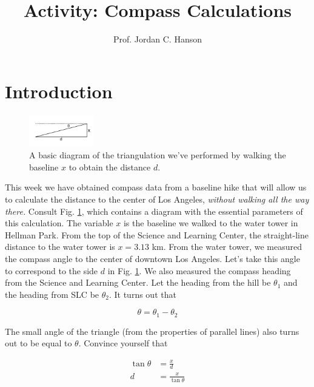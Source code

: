 \documentclass{article}
\begin{document}
\title{Activity: Compass Calculations}
\author{Prof. Jordan C. Hanson}

\maketitle

\section{Introduction}

\begin{figure}[ht]
\centering
\includegraphics[width=0.25\textwidth]{CompassTriangle.pdf}
\caption{\label{fig:triang} A basic diagram of the triangulation we've performed by walking the baseline $x$ to obtain the distance $d$.}
\end{figure}

This week we have obtained compass data from a baseline hike that will allow us to calculate the distance to the center of Los Angeles, \textit{without walking all the way there.}  Consult Fig. \ref{fig:triang}, which contains a diagram with the essential parameters of this calculation.  The variable $x$ is the baseline we walked to the water tower in Hellman Park.  From the top of the Science and Learning Center, the straight-line distance to the water tower is $x = 3.13$ km.  From the water tower, we measured the compass angle to the center of downtown Los Angeles.  Let's take this angle to correspond to the side $d$ in Fig. \ref{fig:triang}.  We also measured the compass heading from the Science and Learning Center.  Let the heading from the hill be $\theta_1$ and the heading from SLC be $\theta_2$.  It turns out that 

\begin{equation}
\theta = \theta_1 - \theta_2
\end{equation}

The small angle of the triangle (from the properties of parallel lines) also turns out to be equal to $\theta$.  Convince yourself that 

\begin{align}
\tan\theta &= \frac{x}{d} \\
d &= \frac{x}{\tan\theta} \label{eq:theone}
\end{align}
\end{document}
